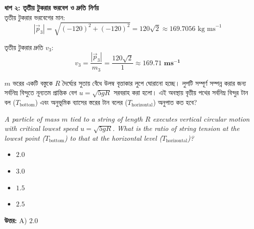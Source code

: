 \documentclass[12pt, a4paper]{article}
\begin{document}
{{\begin{tcolorbox}[solutionbox={সমাধান (Solution)}]
\vspace{0.5em}
\noindent\textbf{ধাপ ২: তৃতীয় টুকরার ভরবেগ ও দ্রুতি নির্ণয়} \\
তৃতীয় টুকরার ভরবেগের মান:
\[|\vec{p}_3| = \sqrt{(-120)^2 + (-120)^2} = 120\sqrt{2} \approx 169.7056\text{ kg ms}^{-1}\]

তৃতীয় টুকরার দ্রুতি $v_3$:
\[v_3 = \frac{|\vec{p}_3|}{m_3} = \frac{120\sqrt{2}}{1} \approx \mathbf{169.71\text{ ms}^{-1}}\]
\end{tcolorbox}

\vspace{2em}

\begin{tcolorbox}[questionbox={প্রশ্ন (Question) 26}]
\noindent
$m$ ভরের একটি বস্তুকে $R$ দৈর্ঘ্যের সুতায় বেঁধে উলম্ব বৃত্তাকার লুপে ঘোরানো হচ্ছে। লুপটি সম্পূর্ণ সম্পন্ন করার জন্য সর্বনিম্ন বিন্দুতে নূন্যতম প্রান্তিক বেগ $u = \sqrt{5gR}$ সরবরাহ করা হলো। এই অবস্থায় বৃত্তীয় পথের সর্বনিম্ন বিন্দুর টান বল ($T_{\text{bottom}}$) এবং অনুভূমিক ব্যাসের স্তরের টান বলের ($T_{\text{horizontal}}$) অনুপাত কত হবে?
\vspace{0.8em}
\begin{english}
\noindent\textit{\color{darkgray}
A particle of mass $m$ tied to a string of length $R$ executes vertical circular motion with critical lowest speed $u = \sqrt{5gR}$. What is the ratio of string tension at the lowest point ($T_{\text{bottom}}$) to that at the horizontal level ($T_{\text{horizontal}}$)?
}
\end{english}
\end{tcolorbox}

\begin{itemize}[label={}, leftmargin=1cm, itemsep=0.5em]
\item[\textbf{A)}] $2.0$
\item[\textbf{B)}] $3.0$
\item[\textbf{C)}] $1.5$
\item[\textbf{D)}] $2.5$
\end{itemize}
\vspace{0.5em}

\begin{tcolorbox}[answerbox]
\textbf{\color{success} উত্তর:} A) $2.0$
\end{tcolorbox}
\vspace{1em}

}}
\end{document}
